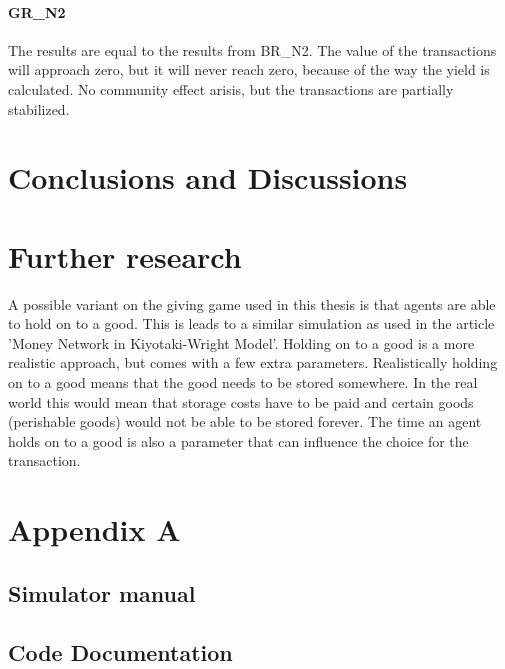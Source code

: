\documentclass[twoside,openright]{uva-bachelor-thesis}
\begin{document}
\subsubsection{GR\_N2}
The results are equal to the results from BR\_N2. The value of the transactions will approach zero, but it will never reach zero, because of the way the yield is calculated. No community effect arisis, but the transactions are partially stabilized.

\chapter{Conclusions and Discussions}

\chapter{Further research}
A possible variant on the giving game used in this thesis is that agents are able to hold on to a good. This is leads to a similar simulation as used in the article 'Money Network in Kiyotaki-Wright Model'. Holding on to a good is a more realistic approach, but comes with a few extra parameters. Realistically holding on to a good means that the good needs to be stored somewhere. In the real world this would mean that storage costs have to be paid and certain goods (perishable goods) would not be able to be stored forever. The time an agent holds on to a good is also a parameter that can influence the choice for the transaction.

\chapter{Appendix A}

\section{Simulator manual}

\section{Code Documentation}
\end{document}
